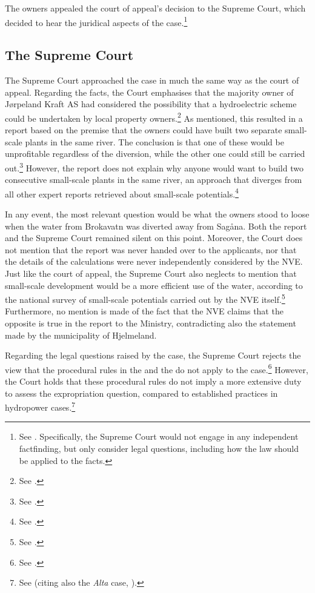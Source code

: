 The owners appealed the court of appeal's decision to the Supreme Court, which decided to hear the  juridical aspects of the case.\footnote{See \cite[8]{jorpeland11}. Specifically, the Supreme Court would not engage in any independent factfinding, but only consider legal questions, including how the law should be applied to the facts.}

\subsection{The Supreme Court}\label{sec:5:6:4}

The Supreme Court approached the case in much the same way as the court of appeal. Regarding the facts, the Court emphasises that the majority owner of Jørpeland Kraft AS had considered the possibility that a hydroelectric scheme could be undertaken by local property owners.\footnote{See \cite[53]{jorpeland11}.} As mentioned, this resulted in a report based on the premise that the owners could have built two separate small-scale plants in the same river. The conclusion is that one of these would be unprofitable regardless of the diversion, while the other one could still be carried out.\footnote{See \cite[23]{jorpeland09}.} However, the report does not explain why anyone would want to build two consecutive small-scale plants in the same river, an approach that diverges from all other expert reports retrieved about small-scale potentials.\footnote{See \cite[16|23]{jorpeland09}.}

In any event, the most relevant question would be what the owners stood to loose when the water from Brokavatn was diverted away from Sagåna. Both the report and the Supreme Court remained silent on this point. Moreover, the Court does not mention that the report was never handed over to the applicants, nor that the details of the calculations were never independently considered by the NVE. Just like the court of appeal, the Supreme Court also neglects to mention that small-scale development would be a more efficient use of the water, according to the national survey of small-scale potentials carried out by the NVE itself.\footnote{See \cite[16]{jorpeland09}.} Furthermore, no mention is made of the fact that the NVE claims that the opposite is true in the report to the Ministry, contradicting also the statement made by the municipality of Hjelmeland.

Regarding the legal questions raised by the case, the Supreme Court rejects the view that the procedural rules in the \cite{ea59} and the \cite{paa67} do not apply to the case.\footnote{See \cite[32-34]{jorpeland11}.} However, the Court holds that these procedural rules do not imply a more extensive duty to assess the expropriation question, compared to established practices in hydropower cases.\footnote{See \cite[51-52]{jorpeland11} (citing also the {\it Alta} case, \cite{alta82}).} 

